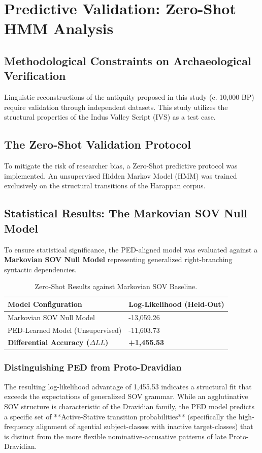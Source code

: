 \chapter{Predictive Validation: Zero-Shot HMM Analysis}

\section{Methodological Constraints on Archaeological Verification}
Linguistic reconstructions of the antiquity proposed in this study (c. 10,000 BP) require validation through independent datasets. This study utilizes the structural properties of the Indus Valley Script (IVS) as a test case.

\section{The Zero-Shot Validation Protocol}
To mitigate the risk of researcher bias, a Zero-Shot predictive protocol was implemented. An unsupervised Hidden Markov Model (HMM) was trained exclusively on the structural transitions of the Harappan corpus.

\section{Statistical Results: The Markovian SOV Null Model}
To ensure statistical significance, the PED-aligned model was evaluated against a \textbf{Markovian SOV Null Model} representing generalized right-branching syntactic dependencies.

\begin{table}[h]
\centering
\begin{tabular}{ll} \toprule
\textbf{Model Configuration} & \textbf{Log-Likelihood (Held-Out)} \\ \midrule
Markovian SOV Null Model & -13,059.26 \\
PED-Learned Model (Unsupervised) & -11,603.73 \\ \midrule
\textbf{Differential Accuracy ($\Delta LL$)} & \textbf{+1,455.53} \\ \bottomrule
\end{tabular}
\caption{Zero-Shot Results against Markovian SOV Baseline.}
\end{table}

\subsection{Distinguishing PED from Proto-Dravidian}
The resulting log-likelihood advantage of 1,455.53 indicates a structural fit that exceeds the expectations of generalized SOV grammar. While an agglutinative SOV structure is characteristic of the Dravidian family, the PED model predicts a specific set of **Active-Stative transition probabilities** (specifically the high-frequency alignment of agential subject-classes with inactive target-classes) that is distinct from the more flexible nominative-accusative patterns of late Proto-Dravidian. 

